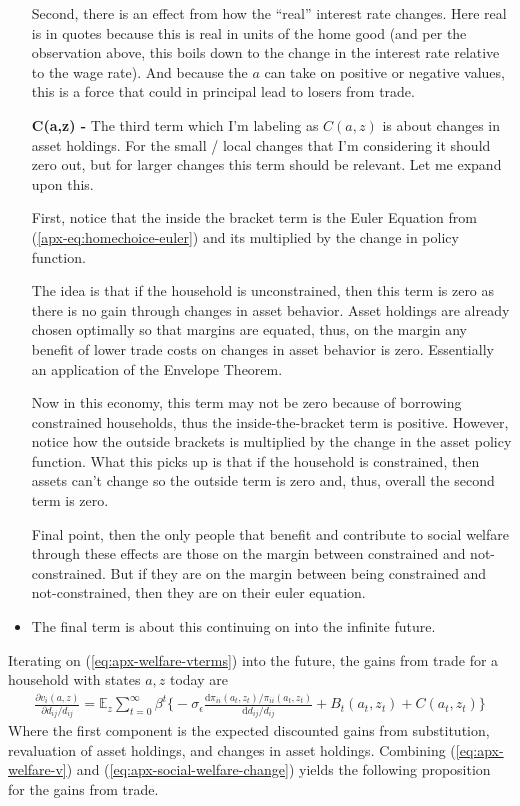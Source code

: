 \documentclass[12pt,pdftex]{article}
\begin{document}
\begin{onehalfspacing}
\begin{itemize}
    Second, there is an effect from how the ``real'' interest rate changes. Here real is in quotes because this is real in units of the home good (and per the observation above, this boils down to the change in the interest rate relative to the wage rate). And because the $a$ can take on positive or negative values, this is a force that could in principal lead to losers from trade.

\item[\textbf{C(a,z) -}]  The third term which I'm labeling as $C(a,z)$ is about changes in asset holdings. For the small / local changes that I'm considering it should zero out, but for larger changes this term should be relevant. Let me expand upon this.

    First, notice that the inside the bracket term is the Euler Equation from (\ref{apx-eq:homechoice-euler}) and its multiplied by the change in policy function.

    The idea is that if the household is unconstrained, then this term is zero as there is no gain through changes in asset behavior. Asset holdings are already chosen optimally so that margins are equated, thus, on the margin any benefit of lower trade costs on changes in asset behavior is zero. Essentially an application of the Envelope Theorem.

    Now in this economy, this term may not be zero because of borrowing constrained households, thus the inside-the-bracket term is positive. However, notice how the outside brackets is multiplied by the change in the asset policy function. What this picks up is that if the household is constrained, then assets can't change so the outside term is zero and, thus, overall the second term is zero.

    Final point, then the only people that benefit and contribute to social welfare through these effects are those on the margin between constrained and not-constrained. But if they are on the margin between being constrained and not-constrained, then they are on their euler equation.

\item The final term is about this continuing on into the infinite future.
\end{itemize}
Iterating on (\ref{eq:apx-welfare-vterms}) into the future, the gains from trade for a household with states $a,z$ today are
\begin{align}
\frac{\partial v_i(a, z)}{\partial d_{ij} / d_{ij}} = \mathbb{E}_{z} \sum_{t = 0}^{\infty} \beta^{t} \bigg \{ -\sigma_{\epsilon} \frac{\mathrm{d} \pi_{ii}(a_{t},z_{t}) / \pi_{ii}(a_{t},z_{t})}{\mathrm{d}d_{ij} / d_{ij}} + B_{t}(a_{t},z_{t}) + C(a_{t},z_{t}) \bigg \}
\label{eq:apx-welfare-v}
\end{align}
Where the first component is the expected discounted gains from substitution, revaluation of asset holdings, and changes in asset holdings. Combining (\ref{eq:apx-welfare-v}) and (\ref{eq:apx-social-welfare-change}) yields the following proposition for the gains from trade.


\end{onehalfspacing}
\end{document}
